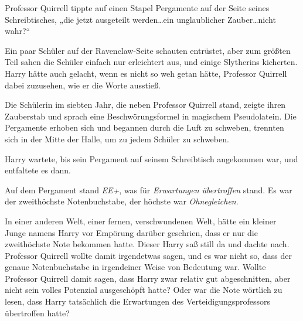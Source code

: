 Professor Quirrell tippte auf einen Stapel Pergamente auf der Seite seines Schreibtisches,
„die jetzt ausgeteilt werden…ein unglaublicher Zauber…nicht wahr?“

Ein paar Schüler auf der Ravenclaw-Seite schauten entrüstet, aber zum größten Teil sahen die Schüler einfach nur erleichtert aus, und einige Slytherins kicherten. Harry hätte auch gelacht, wenn es nicht so weh getan hätte, Professor Quirrell dabei zuzusehen, wie er die Worte ausstieß.

Die Schülerin im siebten Jahr, die neben Professor Quirrell stand, zeigte ihren Zauberstab und sprach eine Beschwörungsformel in magischem Pseudolatein.
Die Pergamente erhoben sich und begannen durch die Luft zu schweben, trennten sich in der Mitte der Halle, um zu jedem Schüler zu schweben.

Harry wartete, bis sein Pergament auf seinem Schreibtisch angekommen war, und entfaltete es dann.

Auf dem Pergament stand \emph{EE+}, was für \emph{Erwartungen übertroffen} stand. Es war der zweithöchste Notenbuchstabe, der höchste war \emph{Ohnegleichen}.

In einer anderen Welt, einer fernen, verschwundenen Welt, hätte ein kleiner Junge namens Harry vor Empörung darüber geschrien, dass er nur die zweithöchste Note bekommen hatte. Dieser Harry saß still da und dachte nach. Professor Quirrell wollte damit irgendetwas sagen, und es war nicht so, dass der genaue Notenbuchstabe in irgendeiner Weise von Bedeutung war.
Wollte Professor Quirrell damit sagen, dass Harry zwar relativ gut abgeschnitten, aber nicht sein volles Potenzial ausgeschöpft hatte? Oder war die Note wörtlich zu lesen, dass Harry tatsächlich die Erwartungen des Verteidigungsprofessors übertroffen hatte?

